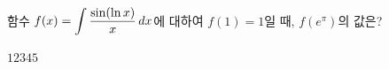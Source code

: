 \hspace*{2mm}\begin{minipage}[t]{\dimexpr\linewidth-2mm\relax}\vspace{0pt}
함수 $f(x)=\displaystyle\int\dfrac{\sin(\ln x)}{x}\mkern3mu dx$에 대하여 $f(1)=1$일 때, $f(e^{\pi})$의 값은?
\begin{choices32}{$1$}{$2$}{$3$}{$4$}{$5$}\end{choices32}\end{minipage}
